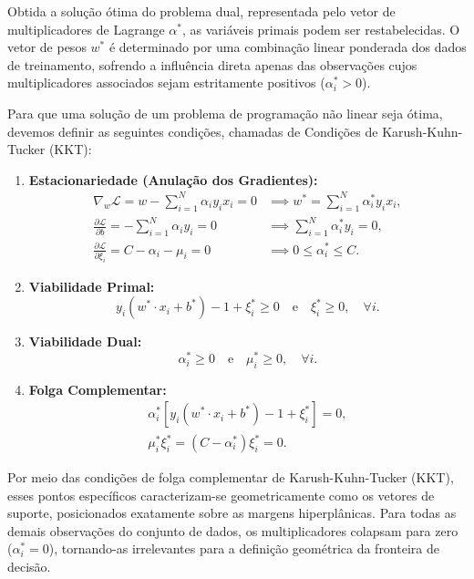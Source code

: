 \documentclass[12pt, a4paper]{article}
\theoremstyle{plain}
\theoremstyle{definition}
\theoremstyle{remark}
\newcommand{\ident}{\hspace{2em}}
\begin{document}
\ident Obtida a solução ótima do problema dual, representada pelo vetor de multiplicadores de Lagrange $\alpha^*$, as variáveis primais podem ser restabelecidas. O vetor de pesos $w^*$ é determinado por uma combinação linear ponderada dos dados de treinamento, sofrendo a influência direta apenas das observações cujos multiplicadores associados sejam estritamente positivos ($\alpha_i^* > 0$).

\ident Para que uma solução de um problema de programação não linear seja ótima, devemos definir as seguintes condições, chamadas de Condições de Karush-Kuhn-Tucker (KKT):

\begin{enumerate}
    \item \textbf{Estacionariedade (Anulação dos Gradientes):}
    \begin{align*}
    \nabla_w \mathcal{L} = w - \sum_{i=1}^{N} \alpha_i y_i x_i = 0 & \implies w^* = \sum_{i=1}^{N} \alpha_i^* y_i x_i, \\
    \frac{\partial \mathcal{L}}{\partial b} = -\sum_{i=1}^{N} \alpha_i y_i = 0 & \implies \sum_{i=1}^{N} \alpha_i^* y_i = 0, \\
    \frac{\partial \mathcal{L}}{\partial \xi_i} = C - \alpha_i - \mu_i = 0 & \implies 0 \le \alpha_i^* \le C.
    \end{align*}
    
    \item \textbf{Viabilidade Primal:}
    \begin{equation*}
    y_i (w^* \cdot x_i + b^*) - 1 + \xi_i^* \ge 0 \quad \text{e} \quad \xi_i^* \ge 0, \quad \forall i.
    \end{equation*}
    
    \item \textbf{Viabilidade Dual:}
    \begin{equation*}
    \alpha_i^* \ge 0 \quad \text{e} \quad \mu_i^* \ge 0, \quad \forall i.
    \end{equation*}
    
    \item \textbf{Folga Complementar:}
    \begin{align*}
    \alpha_i^* \left[ y_i (w^* \cdot x_i + b^*) - 1 + \xi_i^* \right] = 0, \\
    \mu_i^* \xi_i^* = (C - \alpha_i^*) \xi_i^* = 0.
    \end{align*}
\end{enumerate}

\ident Por meio das condições de folga complementar de Karush-Kuhn-Tucker (KKT), esses pontos específicos caracterizam-se geometricamente como os vetores de suporte, posicionados exatamente sobre as margens hiperplânicas. Para todas as demais observações do conjunto de dados, os multiplicadores colapsam para zero ($\alpha_i^* = 0$), tornando-as irrelevantes para a definição geométrica da fronteira de decisão. 
\end{document}
